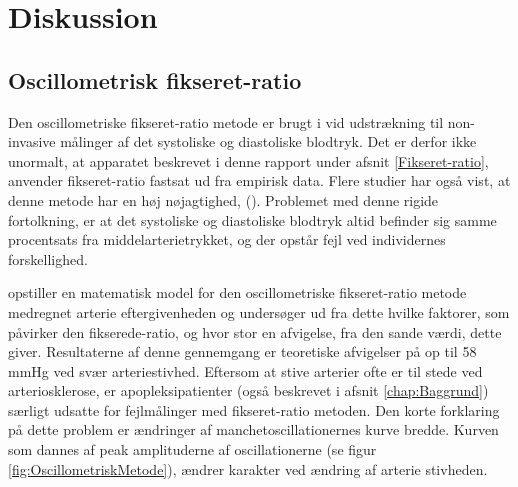 \chapter{Diskussion}

\section{Oscillometrisk fikseret-ratio}
Den oscillometriske fikseret-ratio metode er brugt i vid udstrækning til non-invasive målinger af det systoliske og diastoliske blodtryk. Det er derfor ikke unormalt, at apparatet beskrevet i denne rapport under afsnit \ref{Fikseret-ratio}, anvender fikseret-ratio fastsat ud fra empirisk data. Flere studier har også vist, at denne metode har en høj nøjagtighed, (\cite{drzewiecki1994theory}). Problemet med denne rigide fortolkning, er at det systoliske og diastoliske blodtryk altid befinder sig samme procentsats fra middelarterietrykket, og der opstår fejl ved individernes forskellighed.

 \cite{RefWorks:13} opstiller en matematisk model for den oscillometriske fikseret-ratio metode medregnet arterie eftergivenheden og undersøger ud fra dette hvilke faktorer, som påvirker den fikserede-ratio, og hvor stor en afvigelse, fra den sande værdi, dette giver. Resultaterne af denne gennemgang er teoretiske afvigelser på op til 58 mmHg ved svær arteriestivhed. Eftersom at stive arterier ofte er til stede ved arteriosklerose, er apopleksipatienter (også beskrevet i afsnit \ref{chap:Baggrund}) særligt udsatte for fejlmålinger med fikseret-ratio metoden. Den korte forklaring på dette problem er ændringer af manchetoscillationernes kurve bredde. Kurven som dannes af peak amplituderne af oscillationerne (se figur \ref{fig:OscillometriskMetode}), ændrer karakter ved ændring af arterie stivheden. 

